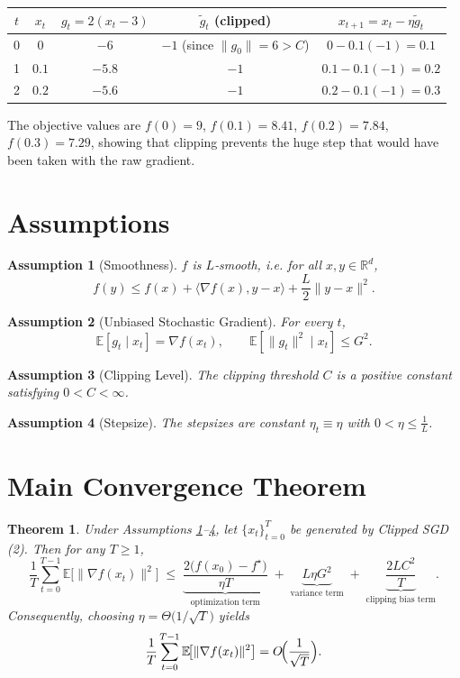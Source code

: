 \documentclass{article}
\newtheorem{theorem}{Theorem}
\newtheorem{assumption}{Assumption}
\newcommand{\E}{\mathbb{E}}
\newcommand{\R}{\mathbb{R}}
\begin{document}
\begin{center}
\begin{tabular}{c|c|c|c|c}
$t$ & $x_{t}$ & $g_{t}=2(x_{t}-3)$ & $\tilde g_{t}$ (clipped) & $x_{t+1}=x_{t}-\eta\tilde g_{t}$ \\ \hline
0 & $0$ & $-6$ & $-1$ (since $\|g_{0}\|=6>C$) & $0-0.1(-1)=0.1$ \\[4pt]
1 & $0.1$ & $-5.8$ & $-1$ & $0.1-0.1(-1)=0.2$ \\[4pt]
2 & $0.2$ & $-5.6$ & $-1$ & $0.2-0.1(-1)=0.3$
\end{tabular}
\end{center}

The objective values are $f(0)=9$, $f(0.1)=8.41$, $f(0.2)=7.84$, $f(0.3)=7.29$, showing that clipping prevents the huge step that would have been taken with the raw gradient.

\newpage

\section*{Assumptions}
\begin{assumption}[Smoothness]\label{as:smooth}
$f$ is $L$‑smooth, i.e. for all $x,y\in\R^{d}$,
\[
f(y)\le f(x)+\langle\nabla f(x),y-x\rangle+\frac{L}{2}\|y-x\|^{2}.
\tag{3}
\]
\end{assumption}
\begin{assumption}[Unbiased Stochastic Gradient]\label{as:unbiased}
For every $t$,
\[
\E\!\left[g_{t}\mid x_{t}\right]=\nabla f(x_{t}),\qquad 
\E\!\left[\|g_{t}\|^{2}\mid x_{t}\right]\le G^{2}.
\tag{4}
\]
\end{assumption}
\begin{assumption}[Clipping Level]\label{as:clip}
The clipping threshold $C$ is a positive constant satisfying $0<C<\infty$.
\end{assumption}
\begin{assumption}[Stepsize]\label{as:stepsize}
The stepsizes are constant $\eta_{t}\equiv\eta$ with $0<\eta\le \frac{1}{L}$.
\end{assumption}

\section*{Main Convergence Theorem}
\begin{theorem}\label{thm:main}
Under Assumptions \ref{as:smooth}–\ref{as:stepsize}, let $\{x_{t}\}_{t=0}^{T}$ be generated by Clipped SGD (2). Then for any $T\ge1$,
\[
\frac{1}{T}\sum_{t=0}^{T-1}\E\!\bigl[\|\nabla f(x_{t})\|^{2}\bigr]
\;\le\;
\underbrace{\frac{2\bigl(f(x_{0})-f^{\star}\bigr)}{\eta T}}_{\text{optimization term}}
\;+\;
\underbrace{L\eta G^{2}}_{\text{variance term}}
\;+\;
\underbrace{\frac{2L C^{2}}{T}}_{\text{clipping bias term}} .
\tag{7}
\]
Consequently, choosing $\eta =\Theta\!\bigl(1/\sqrt{T}\bigr)$ yields
\[
\frac{1}{T}\sum_{t=0}^{T-1}\E\!\bigl[\|\nabla f(x_{t})\|^{2}\bigr]=
O\!\Bigl(\frac{1}{\sqrt{T}}\Bigr).
\]
\end{theorem}
\end{document}
